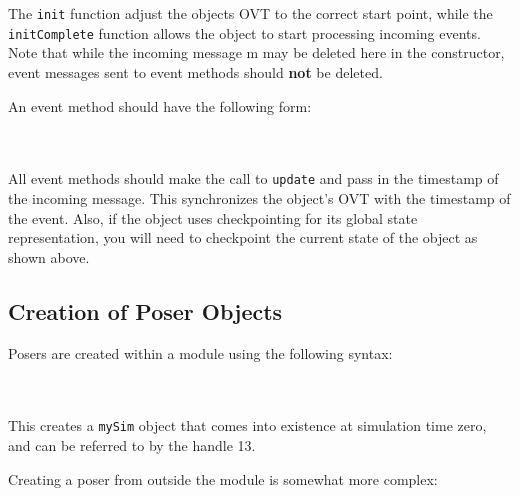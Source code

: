 \documentclass[10pt]{article}
\begin{document}
The {\tt init} function adjust the objects OVT to the correct start
point, while the {\tt initComplete} function allows the object to
start processing incoming events.  Note that while the incoming
message m may be deleted here in the constructor, event messages sent
to event methods should {\bf not} be deleted.

An event method should have the following form:

~\\
\\

All event methods should make the call to {\tt update} and pass in the
timestamp of the incoming message.  This synchronizes the object's OVT
with the timestamp of the event.  Also, if the object uses
checkpointing for its global state representation, you will need to
checkpoint the current state of the object as shown above.

\subsection{Creation of Poser Objects}

Posers are created within a module using the following syntax:

~\\
\\

This creates a {\tt mySim} object that comes into existence at
simulation time zero, and can be referred to by the handle 13.  

Creating a poser from outside the module is somewhat more complex:

~\\
\\
\end{document}
